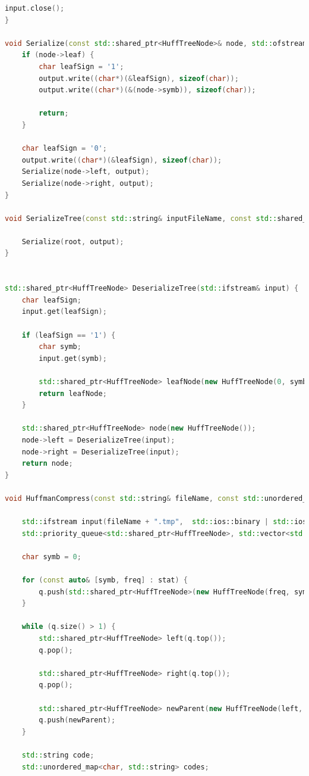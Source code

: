 \documentclass[14pt]{article}
\begin{document}
\begin{lstlisting}[language=C++]
    input.close();
}

void Serialize(const std::shared_ptr<HuffTreeNode>& node, std::ofstream& output) {
    if (node->leaf) {
        char leafSign = '1';
        output.write((char*)(&leafSign), sizeof(char));
        output.write((char*)(&(node->symb)), sizeof(char));

        return;
    }

    char leafSign = '0';
    output.write((char*)(&leafSign), sizeof(char));
    Serialize(node->left, output);
    Serialize(node->right, output);
}

void SerializeTree(const std::string& inputFileName, const std::shared_ptr<HuffTreeNode>& root, std::ofstream& output) {
                    
    Serialize(root, output);
}


std::shared_ptr<HuffTreeNode> DeserializeTree(std::ifstream& input) {
    char leafSign;
    input.get(leafSign);

    if (leafSign == '1') {
        char symb;
        input.get(symb);

        std::shared_ptr<HuffTreeNode> leafNode(new HuffTreeNode(0, symb));
        return leafNode;
    }

    std::shared_ptr<HuffTreeNode> node(new HuffTreeNode());
    node->left = DeserializeTree(input);
    node->right = DeserializeTree(input);
    return node;
}

void HuffmanCompress(const std::string& fileName, const std::unordered_map<char, int>& stat, uint64_t fileSize) {

    std::ifstream input(fileName + ".tmp",  std::ios::binary | std::ios::in);
    std::priority_queue<std::shared_ptr<HuffTreeNode>, std::vector<std::shared_ptr<HuffTreeNode>>, CompareNodes> q;

    char symb = 0;

    for (const auto& [symb, freq] : stat) {
        q.push(std::shared_ptr<HuffTreeNode>(new HuffTreeNode(freq, symb)));
    }

    while (q.size() > 1) {
        std::shared_ptr<HuffTreeNode> left(q.top());
        q.pop();

        std::shared_ptr<HuffTreeNode> right(q.top());
        q.pop();

        std::shared_ptr<HuffTreeNode> newParent(new HuffTreeNode(left, right));
        q.push(newParent);
    }

    std::string code;
    std::unordered_map<char, std::string> codes;


\end{lstlisting}
\end{document}
